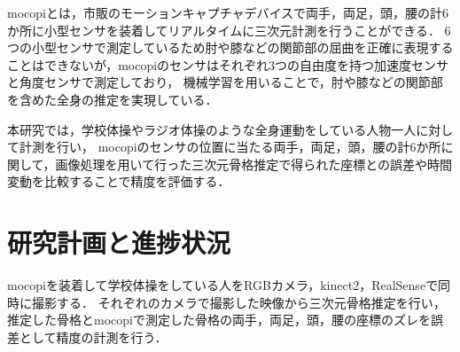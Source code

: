 \documentclass[titlepage]{jarticle}
\begin{document}
mocopiとは，市販のモーションキャプチャデバイスで両手，両足，頭，腰の計6か所に小型センサを装着してリアルタイムに三次元計測を行うことができる．
6つの小型センサで測定しているため肘や膝などの関節部の屈曲を正確に表現することはできないが，mocopiのセンサはそれぞれ3つの自由度を持つ加速度センサと角度センサで測定しており，
機械学習を用いることで，肘や膝などの関節部を含めた全身の推定を実現している．



本研究では，学校体操やラジオ体操のような全身運動をしている人物一人に対して計測を行い，
mocopiのセンサの位置に当たる両手，両足，頭，腰の計6か所に関して，画像処理を用いて行った三次元骨格推定で得られた座標との誤差や時間変動を比較することで精度を評価する．
%
%
%

%
%
%
%
%

%
%
%
%
\section{研究計画と進捗状況}
%

%
%
%
mocopiを装着して学校体操をしている人をRGBカメラ，kinect2，RealSenseで同時に撮影する．
それぞれのカメラで撮影した映像から三次元骨格推定を行い，推定した骨格とmocopiで測定した骨格の両手，両足，頭，腰の座標のズレを誤差として精度の計測を行う．
\end{document}
